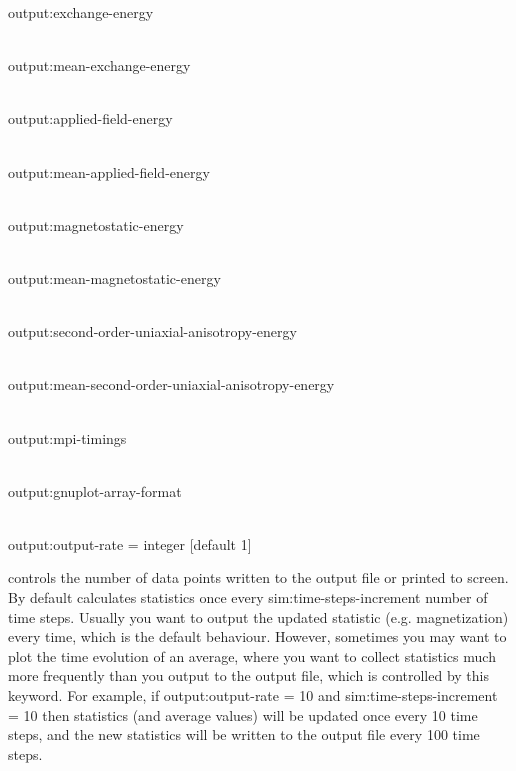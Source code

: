 {\zicf output:exchange-energy}\\

{\zicf output:mean-exchange-energy}\\

{\zicf output:applied-field-energy}\\

{\zicf output:mean-applied-field-energy}\\

{\zicf output:magnetostatic-energy}\\

{\zicf output:mean-magnetostatic-energy}\\

{\zicf output:second-order-uniaxial-anisotropy-energy}\\

{\zicf output:mean-second-order-uniaxial-anisotropy-energy}\\

{\zicf output:mpi-timings}\\

{\zicf output:gnuplot-array-format}\\

{\zicf output:output-rate = integer [default 1]}
controls the number of data points written to the output file or printed to screen. By default \vampire
calculates statistics once every sim:time-steps-increment number of time steps. Usually you want to
output the updated statistic (e.g. magnetization) every time, which is the default behaviour. However,
sometimes you may want to plot the time evolution of an average, where you want to collect statistics
much more frequently than you output to the output file, which is controlled by this keyword. For
example, if output:output-rate = 10 and sim:time-steps-increment = 10 then statistics (and average
values) will be updated once every 10 time steps, and the new statistics will be written to the output
file every 100 time steps.\\

